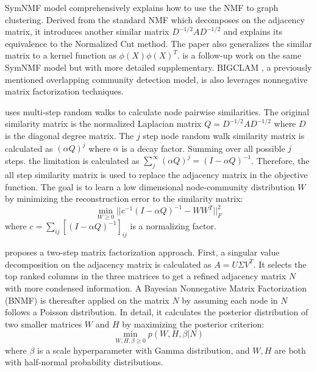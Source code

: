 SymNMF model \cite{kuang2012symmetric} comprehensively explains how to use the NMF to graph clustering. Derived from the standard NMF which decomposes on the adjacency matrix, it introduces another similar matrix $D^{-1/2}AD^{-1/2}$ and explains its equivalence to the Normalized Cut method. The paper also generalizes the similar matrix to a kernel function as $\phi(X)\phi(X)^T$. \cite{kuang2015symnmf} is a follow-up work on the same SymNMF model but with more detailed supplementary. BIGCLAM \cite{yang2013overlapping}, a previously mentioned overlapping community detection model, is also leverages nonnegative matrix factorization techniques.

\cite{yang2012clustering} uses multi-step random walks to calculate node pairwise similarities. The original similarity matrix is the normalized Laplacian matrix $Q=D^{-1/2}AD^{-1/2}$ where $D$ is the diagonal degree matrix. The $j$ step node random walk similarity matrix is calculated as $(\alpha Q)^j$ where $\alpha$ is a decay factor. Summing over all possible $j$ steps. the limitation is calculated as $\sum_j^{\infty}(\alpha Q)^j = (I-\alpha Q)^{-1}$. Therefore, the all step similarity matrix is used to replace the adjacency matrix in the objective function. The goal is to learn a low dimensional node-community distribution $W$ by minimizing the reconstruction error to the similarity matrix:
\begin{equation}
\min_{W \geq 0} ||c^{-1}(I-\alpha Q)^{-1} - WW^T||^2_{F}
\end{equation}
where $c=\sum_{ij}[(I-\alpha Q)^{-1}]_{ij}$ is a normalizing factor.

\cite{tang2014uncovering} proposes a two-step matrix factorization approach. First, a singular value decomposition on the adjacency matrix is calculated as $A= U\Sigma V^T$. It selects the top ranked columns in the three matrices to get a refined adjacency matrix $N$ with more condensed information. A Bayesian Nonnegative Matrix Factorization (BNMF)  \cite{psorakis2011overlapping}  is thereafter applied on the matrix $N$ by assuming each node in $N$ follows a Poisson distribution. In detail, it calculates the posterior distribution of two smaller matrices $W$ and $H$ by maximizing the posterior criterion:
\begin{equation}
\min_{W,H,\beta \geq 0} p(W,H,\beta|N)
\end{equation}
where $\beta$ is a scale hyperparameter with Gamma distribution, and $W,H$ are both with half-normal probability distributions.

